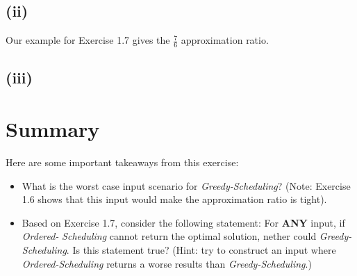 \documentclass[11pt]{article}
\begin{document}
\subsection*{(ii)} \noindent
Our example for Exercise 1.7 gives the $\frac{7}{6}$ approximation ratio.
\subsection*{(iii)} \noindent

\section*{Summary}
Here are some important takeaways from this exercise:
\begin{itemize}
  \item What is the worst case input scenario for \textit{Greedy-Scheduling}?
  (Note: Exercise 1.6 shows that this input would make the approximation ratio is tight).
  \item Based on Exercise 1.7, consider the following statement: For \textbf{ANY} input, if \textit{Ordered-} \textit{Scheduling} cannot return the optimal solution, 
  nether could \textit{Greedy-Scheduling}. Is this statement true? (Hint: try to construct an input where \textit{Ordered-Scheduling} returns a worse results than
  \textit{Greedy-Scheduling}.)
\end{itemize}
\end{document}
